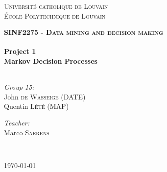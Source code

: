 \begin{titlepage}
    	
        
        \center
        
        \textsc{\LARGE Université catholique de Louvain}\\[1.3cm]
        \textsc{\Large École Polytechnique de Louvain}\\
        
        
        \vfill
                
        \textsc{\bfseries \Large SINF2275 - Data mining and decision making}\\[1.7cm]
        
        \HRule \\[0.3cm]
        {\LARGE \bfseries Project 1 \\[0.3cm] Markov Decision Processes}\\[0.3cm]
        \HRule \\[2cm]
        
        \begin{minipage}{0.4\textwidth}
            \begin{flushleft} \large
            	\emph{Group 15:}\\
                John \textsc{de Wasseige} (DATE)\\
                Quentin \textsc{Lété} (MAP)\\
            \end{flushleft}
        \end{minipage}
        \hfill
        \begin{minipage}{0.4\textwidth}
            \begin{flushright} \large
                \emph{Teacher:} \\
                    Marco \textsc{Saerens} \\[0.3cm]
            \end{flushright}
        \end{minipage}\\[3cm]
        
        \vfill
        
        {\large \today}
    
\end{titlepage}